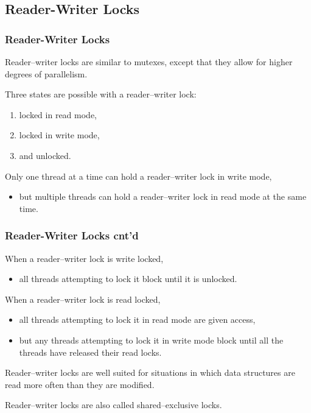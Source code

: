 \documentclass[newPxFont,sthlmFooter,nooffset]{beamer}
\begin{document}
\subsection{Reader-Writer Locks}


\begin{frame}[t]
  \frametitle{Reader-Writer Locks}
Reader–writer locks are similar to mutexes, except that they allow for higher degrees of parallelism.

Three states are possible with a reader–writer lock: 
\begin{enumerate}
\item locked in read mode,
\item locked in write mode,
\item and unlocked.
\end{enumerate}

Only one thread at a time can hold a reader–writer lock in write mode,
\begin{itemize}
\item but multiple threads can hold a reader–writer lock in read mode
  at the same time.
\end{itemize}

\end{frame}

\begin{frame}[t]
  \frametitle{Reader-Writer Locks cnt'd}
When a reader–writer lock is write locked,
\begin{itemize}
\item all threads attempting to lock it block until it is unlocked.
\end{itemize}
When a reader–writer lock is read locked,
\begin{itemize}
\item all threads attempting to lock it in read mode are given access,
\item but any threads attempting to lock it in write mode block until all
  the threads have released their read locks.
\end{itemize}

Reader–writer locks are well suited for situations in which data structures are read more often than they are modified. 

Reader–writer locks are also called shared–exclusive locks. 
\end{frame}
\end{document}
